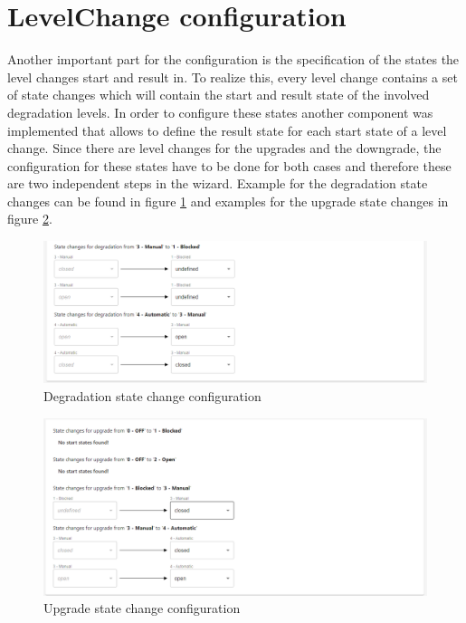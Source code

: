 \section{LevelChange configuration}
Another important part for the configuration is the specification of the states the level changes start and result in. To realize this, every level change contains a set of state changes which will contain the start and result state of the involved degradation levels. In order to configure these states another component was implemented that allows to define the result state for each start state of a level change. Since there are level changes for the upgrades and the downgrade, the configuration for these states have to be done for both cases and therefore these are two independent steps in the wizard. Example for the degradation state changes can be found in figure \ref{fig:deg_state_change} and examples for the upgrade state changes in figure \ref{fig:upg:state_change}. 

\begin{figure}[ht]
    \centering
    \includegraphics[width=\textwidth]{img/degradation_level_change_states.png}
    \caption{Degradation state change configuration}
    \label{fig:deg_state_change}
\end{figure}

\begin{figure}[ht]
    \centering
    \includegraphics[width=\textwidth]{img/upgrade_level_change_states.png}
    \caption{Upgrade state change configuration}
    \label{fig:upg:state_change}
\end{figure}

